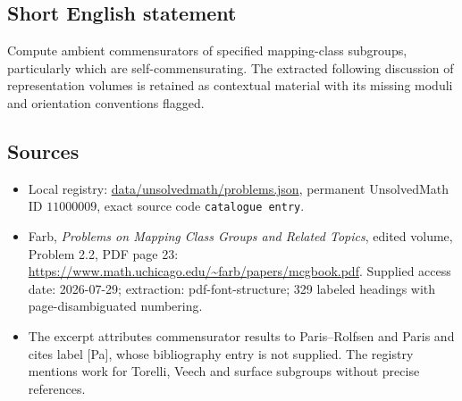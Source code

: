 \documentclass[11pt]{article}
\begin{document}
\subsection{Short English statement}
Compute ambient commensurators of specified mapping-class subgroups, particularly which are self-commensurating. The extracted following discussion of representation volumes is retained as contextual material with its missing moduli and orientation conventions flagged.
\subsection{Sources}
\begin{itemize}
\item Local registry: \url{data/unsolvedmath/problems.json}, permanent UnsolvedMath ID $11000009$, exact source code \texttt{catalogue entry}.
\item Farb, \emph{Problems on Mapping Class Groups and Related Topics}, edited volume, Problem 2.2, PDF page 23: \url{https://www.math.uchicago.edu/~farb/papers/mcgbook.pdf}. Supplied access date: 2026-07-29; extraction: pdf-font-structure; 329 labeled headings with page-disambiguated numbering.
\item The excerpt attributes commensurator results to Paris--Rolfsen and Paris and cites label [Pa], whose bibliography entry is not supplied. The registry mentions work for Torelli, Veech and surface subgroups without precise references.
\end{itemize}
\end{document}
